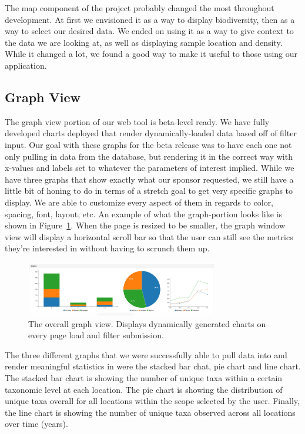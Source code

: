 \documentclass[10pt,draftclsnofoot,onecolumn]{IEEEtran}
\begin{document}
The map component of the project probably changed the most throughout development.
At first we envisioned it as a way to display biodiversity, then as a way to select our desired data.
We ended on using it as a way to give context to the data we are looking at, as well as displaying sample location and density.
While it changed a lot, we found a good way to make it useful to those using our application.

\subsection{Graph View} %
The graph view portion of our web tool is beta-level ready.
We have fully developed charts deployed that render dynamically-loaded data based off of filter input.
Our goal with these graphs for the beta release was to have each one not only pulling in data from the database, but rendering it in the correct way with x-values and labels set to whatever the parameters of interest implied.
While we have three graphs that show exactly what our sponsor requested, we still have a little bit of honing to do in terms of a stretch goal to get very specific graphs to display.
We are able to customize every aspect of them in regards to color, spacing, font, layout, etc.
An example of what the graph-portion looks like is shown in Figure~\ref{fig:graph_view}.
When the page is resized to be smaller, the graph window view will display a horizontal scroll bar so that the user can still see the metrics they’re interested in without having to scrunch them up.

\begin{figure}[h]
\centering
\includegraphics[width=0.75\textwidth]{images/graph_view.jpg}
\captionsetup{justification=centering}
\caption{
  The overall graph view.
  Displays dynamically generated charts on every page load and filter submission.
}
\label{fig:graph_view}
\end{figure}

The three different graphs that we were successfully able to pull data into and render meaningful statistics in were the stacked bar chat, pie chart and line chart.
The stacked bar chart is showing the number of unique taxa within a certain taxonomic level at each location.
The pie chart is showing the distribution of unique taxa overall for all locations within the scope selected by the user.
Finally, the line chart is showing the number of unique taxa observed across all locations over time (years).
\end{document}
